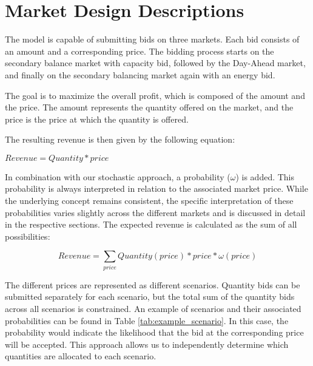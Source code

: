 \section{Market Design Descriptions}
\label{chap:marketDesignDescription}

The model is capable of submitting bids on three markets. Each bid consists of an amount and a corresponding price.
The bidding process starts on the secondary balance market with capacity bid, followed by the Day-Ahead market,
and finally on the secondary balancing market again with an energy bid.



The goal is to maximize the overall profit, which is composed of the amount and the price.
The amount represents the quantity offered on the market, and the price is the price at which the quantity is offered.

The resulting revenue is then given by the following equation:

$Revenue = Quantity * price$

In combination with our stochastic approach, a probability ($\omega$) is added.
This probability is always interpreted in relation to the associated market price.
While the underlying concept remains consistent, the specific interpretation of these probabilities
varies slightly across the different markets and is discussed in detail in the respective sections.
The expected revenue is calculated as the sum of all possibilities:

\begin{equation}
	Revenue = \sum_{price} Quantity(price) * price * \omega(price)
\end{equation}

The different prices are represented as different scenarios. Quantity bids can be submitted separately for each scenario,
but the total sum of the quantity bids across all scenarios is constrained.
An example of scenarios and their associated probabilities can be found in Table \ref{tab:example_scenario}.
In this case, the probability would indicate the likelihood that the bid at the corresponding price will be accepted.
This approach allows us to independently determine which quantities are allocated to each scenario.


